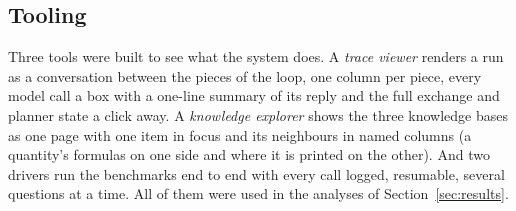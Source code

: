 \subsection{Tooling}

Three tools were built to see what the system does. A \emph{trace viewer} renders a run as a conversation between the pieces of the loop, one column per piece, every model call a box with a one-line summary of its reply and the full exchange and planner state a click away. A \emph{knowledge explorer} shows the three knowledge bases as one page with one item in focus and its neighbours in named columns (a quantity's formulas on one side and where it is printed on the other). And two drivers run the benchmarks end to end with every call logged, resumable, several questions at a time. All of them were used in the analyses of Section~\ref{sec:results}.
